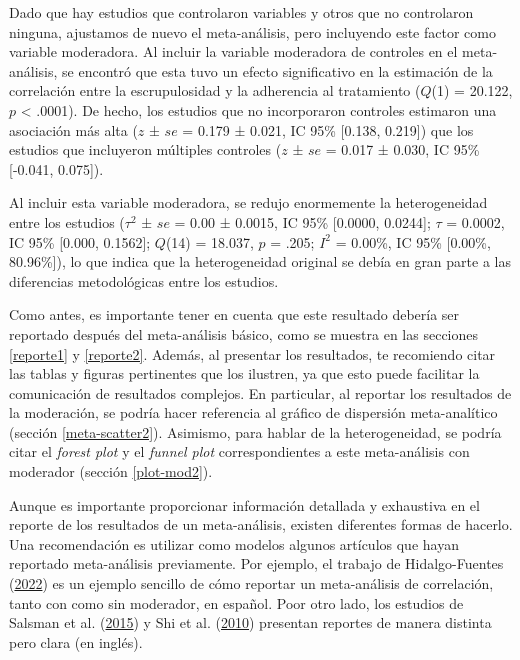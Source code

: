 \documentclass[
  bookmarksnumbered]{article}
\begin{document}
\begin{tcolorbox}[enhanced,attach boxed title to top center={yshift=-3mm,yshifttext=-1mm},
  colback=iacol!5!white,colframe=iacol!75!white,colbacktitle=iacol,
  title=Ejemplo de reporte con moderador categórico,fonttitle=\bfseries, parbox=false,
  boxed title style={size=small,colframe=iacol} ]
  
Dado que hay estudios que controlaron variables y otros que no controlaron ninguna, ajustamos de nuevo el meta-análisis, pero incluyendo este factor como variable moderadora. Al incluir la variable moderadora de controles en el meta-análisis, se encontró que esta tuvo un efecto significativo en la estimación de la correlación entre la escrupulosidad y la adherencia al tratamiento ($Q$(1) = 20.122, $p$ < .0001). De hecho, los estudios que no incorporaron controles estimaron una asociación más alta ($z$ ± $se$ = 0.179 ± 0.021, IC 95\% [0.138, 0.219]) que los estudios que incluyeron múltiples controles ($z$ ± $se$ = 0.017 ± 0.030, IC 95\% [-0.041, 0.075]).

Al incluir esta variable moderadora, se redujo enormemente la heterogeneidad entre los estudios ($\tau^2$ ± $se$ =  0.00 ± 0.0015, IC 95\% [0.0000, 0.0244]; $\tau$ = 0.0002, IC 95\% [0.000, 0.1562]; $Q$(14) = 18.037, $p$ = .205; $I^2$ = 0.00\%, IC 95\% [0.00\%, 80.96\%]), lo que indica que la heterogeneidad original se debía en gran parte a las diferencias metodológicas entre los estudios.  

\end{tcolorbox}

Como antes, es importante tener en cuenta que este resultado debería ser reportado después del meta-análisis básico, como se muestra en las secciones \ref{reporte1} y \ref{reporte2}. Además, al presentar los resultados, te recomiendo citar las tablas y figuras pertinentes que los ilustren, ya que esto puede facilitar la comunicación de resultados complejos. En particular, al reportar los resultados de la moderación, se podría hacer referencia al gráfico de dispersión meta-analítico (sección \ref{meta-scatter2}). Asimismo, para hablar de la heterogeneidad, se podría citar el \emph{forest plot} y el \emph{funnel plot} correspondientes a este meta-análisis con moderador (sección \ref{plot-mod2}).

Aunque es importante proporcionar información detallada y exhaustiva en el reporte de los resultados de un meta-análisis, existen diferentes formas de hacerlo. Una recomendación es utilizar como modelos algunos artículos que hayan reportado meta-análisis previamente. Por ejemplo, el trabajo de Hidalgo-Fuentes (\protect\hyperlink{ref-hidalgo-fuentesUsoProblematicoInternet2022}{2022}) es un ejemplo sencillo de cómo reportar un meta-análisis de correlación, tanto con como sin moderador, en español. Poor otro lado, los estudios de Salsman et al. (\protect\hyperlink{ref-salsmanMetaanalyticApproachExamining2015}{2015}) y Shi et al. (\protect\hyperlink{ref-shiCorrelationAdherenceRates2010}{2010}) presentan reportes de manera distinta pero clara (en inglés).
\end{document}
